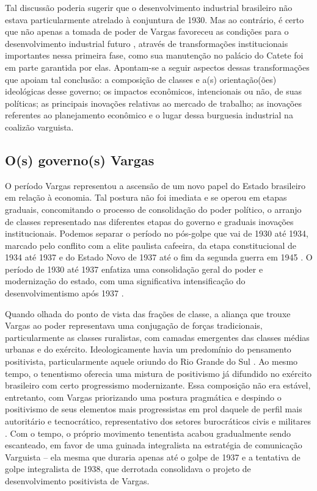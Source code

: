 Tal discussão poderia sugerir que o desenvolvimento industrial
brasileiro não estava particularmente atrelado à conjuntura de 1930. Mas
ao contrário, é certo que não apenas a tomada de poder de Vargas
favoreceu as condições para o desenvolvimento industrial futuro 
\citep[]{perissinotto_ideias_2023}, através
de transformações institucionais importantes nessa primeira fase, como
sua manutenção no palácio do Catete foi em parte garantida por elas.
Apontam-se a seguir aspectos dessas transformações que apoiam tal
conclusão: a composição de classes e a(s) orientação(ões) ideológicas
desse governo; os impactos econômicos, intencionais ou não, de suas
políticas; as principais inovações relativas ao mercado de trabalho; as
inovações referentes ao planejamento econômico e o lugar dessa burguesia
industrial na coalizão varguista.

\subsection{O(s) governo(s) Vargas}

O período Vargas representou a ascensão de um novo
papel do Estado brasileiro em relação à economia. Tal postura não foi imediata 
e se operou em etapas graduais, concomitando
o processo de consolidação do poder político, o arranjo de classes
representado nas diferentes etapas do governo e graduais inovações
institucionais. Podemos separar o período no pós-golpe que vai de 1930
até 1934, marcado pelo conflito com a elite paulista cafeeira, da etapa
constitucional de 1934 até 1937 e do Estado Novo de 1937 até o fim da
segunda guerra em 1945 \citeyearpar{schwarcz_brasil_2015}. 
O período de 1930 até 1937 enfatiza
uma consolidação geral do poder e modernização do estado, com uma
significativa intensificação do desenvolvimentismo após 1937 \citep{perissinotto_ideias_2023}.

Quando olhada do ponto de vista das frações de classe, a aliança que trouxe Vargas ao poder
representava uma conjugação de forças tradicionais, particularmente as
classes ruralistas, com camadas emergentes das classes médias urbanas e
do exército. Ideologicamente havia um predomínio do pensamento
positivista, particularmente aquele oriundo do Rio Grande do Sul
\citep{perissinotto_ideias_2023}. Ao mesmo tempo, o tenentismo oferecia uma mistura de
positivismo já difundido no exército brasileiro
\citep{perissinotto_ideias_2023} com certo progressismo modernizante. Essa composição não
era estável, entretanto, com Vargas priorizando uma postura pragmática
\citep{schwarcz_brasil_2015} e despindo o positivismo de seus elementos mais
progressistas em prol daquele de perfil mais autoritário e tecnocrático, representativo
dos setores burocráticos civis e militares \citep{perissinotto_ideias_2023}. Com o tempo,
o próprio movimento tenentista acabou gradualmente sendo escanteado, em favor de
uma guinada integralista na estratégia de comunicação
Varguista \citep{schwarcz_brasil_2015} -- ela mesma que duraria apenas até o golpe de 1937 e
a tentativa de golpe integralista de 1938, que derrotada consolidava o
projeto de desenvolvimento positivista de Vargas.

